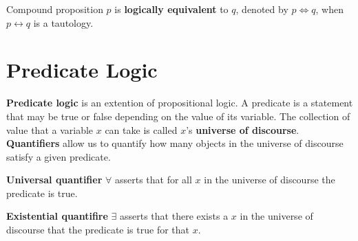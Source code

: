 \begin{definition}
    Compound proposition \(p\) is \textbf{logically equivalent} to \(q\), denoted by \(p \Leftrightarrow q\), when \(p \leftrightarrow q\) is a tautology.
\end{definition}

\section{Predicate Logic}
\textbf{Predicate logic} is an extention of propositional logic. A predicate is a statement that may be true or false depending on the value of its variable.
The collection of value that a variable \(x\) can take is called \(x\)'s \textbf{universe of discourse}.
\textbf{Quantifiers} allow us to quantify how many objects in the universe of discourse satisfy a given predicate.

\begin{definition}
    \textbf{Universal quantifier} \(\forall\) asserts that for all \(x\) in the universe of discourse the predicate is true.
\end{definition}

\begin{definition}
    \textbf{Existential quantifire} \(\exists\) asserts that there exists a \(x\) in the universe of discourse that the predicate is true for that \(x\).
\end{definition}


